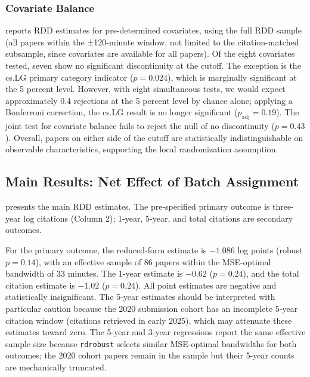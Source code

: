 \documentclass[12pt]{article}
\begin{document}
\subsubsection{Covariate Balance}

 reports RDD estimates for pre-determined covariates, using the full RDD sample (all papers within the ±120-minute window, not limited to the citation-matched subsample, since covariates are available for all papers). Of the eight covariates tested, seven show no significant discontinuity at the cutoff. The exception is the cs.LG primary category indicator ($p = 0.024$), which is marginally significant at the 5 percent level. However, with eight simultaneous tests, we would expect approximately 0.4 rejections at the 5 percent level by chance alone; applying a Bonferroni correction, the cs.LG result is no longer significant ($p_{\text{adj}} = 0.19$). The joint test for covariate balance fails to reject the null of no discontinuity ($p = 0.43$). Overall, papers on either side of the cutoff are statistically indistinguishable on observable characteristics, supporting the local randomization assumption.



\subsection{Main Results: Net Effect of Batch Assignment}

 presents the main RDD estimates. The pre-specified primary outcome is three-year log citations (Column 2); 1-year, 5-year, and total citations are secondary outcomes.



For the primary outcome, the reduced-form estimate is $-1.086$ log points (robust $p = 0.14$), with an effective sample of 86 papers within the MSE-optimal bandwidth of 33 minutes. The 1-year estimate is $-0.62$ ($p = 0.24$), and the total citation estimate is $-1.02$ ($p = 0.24$). All point estimates are negative and statistically insignificant. The 5-year estimates should be interpreted with particular caution because the 2020 submission cohort has an incomplete 5-year citation window (citations retrieved in early 2025), which may attenuate these estimates toward zero. The 5-year and 3-year regressions report the same effective sample size because \texttt{rdrobust} selects similar MSE-optimal bandwidths for both outcomes; the 2020 cohort papers remain in the sample but their 5-year counts are mechanically truncated.
\end{document}
